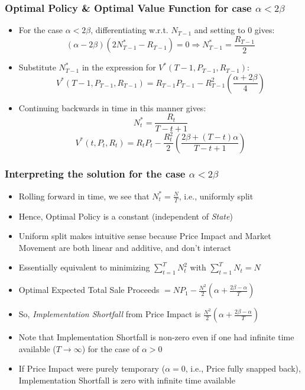 \documentclass[handout]{beamer}
\begin{document}
\begin{frame}
\frametitle{Optimal Policy \& Optimal Value Function for case $\alpha < 2\beta$}
\pause
\begin{itemize}[<+->]
\item For the case $\alpha < 2\beta$, differentiating w.r.t. $N_{T-1}$ and setting to 0 gives:
$$(\alpha - 2\beta)(2N^*_{T-1} - R_{T-1}) = 0 \Rightarrow N^*_{T-1} = \frac {R_{T-1}} 2$$
\item Substitute $N^*_{T-1}$ in the expression for $V^*(T-1,P_{T-1},R_{T-1})$:
$$V^*(T-1,P_{T-1},R_{T-1}) =  R_{T-1} P_{T-1} - R_{T-1}^2 (\frac {\alpha + 2\beta} 4)$$
\item Continuing backwards in time in this manner gives:
$$N^*_t = \frac {R_t} {T-t+1}$$
$$V^*(t, P_t,R_t) = R_t P_t - \frac {R_t^2} 2 (\frac {2\beta + (T-t)\alpha} {T-t+1})$$
\end{itemize}
\end{frame}

\begin{frame}
\frametitle{Interpreting the solution for the case $\alpha < 2\beta$}
\pause
\begin{itemize}[<+->]
\item Rolling forward in time, we see that $N^*_t = \frac N T$, i.e., uniformly split
\item Hence, Optimal Policy is a constant (independent of {\em State})
\item Uniform split makes intuitive sense because Price Impact and Market Movement are both linear and additive, and don't interact
\item Essentially equivalent to minimizing $\sum_{t=1}^T N_t^2$ with $\sum_{t=1}^T N_t = N$
\item Optimal Expected Total Sale Proceeds $= NP_1 - \frac {N^2} 2 (\alpha + \frac {2\beta - \alpha} T)$
\item So, {\em Implementation Shortfall} from Price Impact is $\frac {N^2} 2 (\alpha + \frac {2\beta - \alpha} T)$
\item Note that Implementation Shortfall is non-zero even if one had infinite time available ($T\rightarrow \infty$) for the case of $\alpha > 0$
\item If Price Impact were purely temporary ($\alpha = 0$, i.e., Price fully snapped back), Implementation Shortfall is zero with infinite time available
\end{itemize}
\end{frame}
\end{document}
